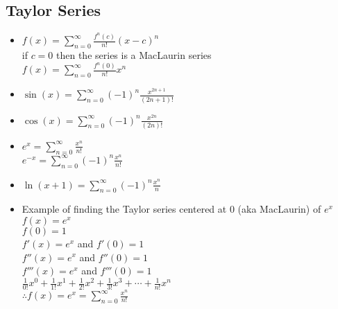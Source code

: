 \documentclass{article}
\begin{document}
  \subsection*{\color{BrickRed}Taylor Series}
  \begin{multicols}{2}
  \begin{itemize}
    \item \(
      f(x)=\sum\limits_{n=0}^{\infty}\frac{f^n(c)}{n!}(x-c)^n\)\\
      if \(c=0\) then the series is a MacLaurin series\\
      \subitem
      \(f(x)=\sum\limits_{n=0}^{\infty}\frac{f^n(0)}{n!}x^n\)\\
    \item  \(\sin(x)=\sum\limits_{n=0}^{\infty} (-1)^n
      \frac{x^{2n+1}}{(2n+1)!}\)\\
    \item \(\cos(x)=\sum\limits_{n=0}^{\infty}(-1)^n\frac{x^{2n}}{(2n)!}
     \)\\
    \item\( e^x=\sum\limits_{n=0}^{\infty}\frac{x^n}{n!} \)\\
      \subitem \( e^{-x}=\sum\limits_{n=0}^{\infty}(-1)^n
      \frac{x^n}{n!} \)\\
    \item \(\ln(x+1)=\sum\limits_{n=0}^{\infty}(-1)^n\frac{x^n}{n}\)\\
      \columnbreak
    \item Example of finding the Taylor series centered at 0 (aka
      MacLaurin) of \(e^x\)\\
      \subitem \(f(x)=e^x\)\\
      \subitem \(f(0)=1\)\\
      \(f'(x)=e^x\) and \(f'(0)=1\)\\
      \(f''(x)=e^x\) and \(f''(0)=1\)\\
      \(f'''(x)=e^x\) and \(f'''(0)=1\)\\
      \(\frac{1}{0!}x^0+\frac{1}{1!}x^1+\frac{1}{2!}x^2+\frac{1}{3!}x^3+\cdots+\frac{1}{n!}x^n\)\\
      \(\therefore f(x)=e^x=\sum\limits_{n=0}^{\infty}
      \frac{x^n}{n!}\)\\
  \end{itemize}
\end{multicols}
\newpage
\end{document}
